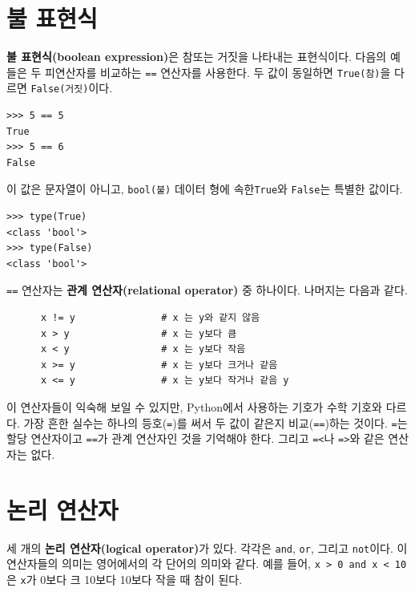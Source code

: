 \documentclass[10pt]{book}
\begin{document}
\section{불 표현식}

{\bf 불 표현식(boolean expression)}은 참또는 거짓을 나타내는 표현식이다.  다음의 예들은 두 피연산자를 비교하는 {\tt ==} 연산자를 사용한다.  두 값이 동일하면 {\tt True(참)}을 다르면 {\tt False(거짓)}이다. 

\begin{verbatim}
>>> 5 == 5
True
>>> 5 == 6
False
\end{verbatim}
%
이 값은 문자열이 아니고, {\tt bool(불)} 데이터 형에 속한{\tt True}와
{\tt False}는 특별한 값이다.

\begin{verbatim}
>>> type(True)
<class 'bool'>
>>> type(False)
<class 'bool'>
\end{verbatim}
%
{\tt ==} 연산자는 {\bf 관계 연산자(relational operator)} 중 하나이다.
나머지는 다음과 같다.

\begin{verbatim}
      x != y               # x 는 y와 같지 않음
      x > y                # x 는 y보다 큼
      x < y                # x 는 y보다 작음
      x >= y               # x 는 y보다 크거나 같음
      x <= y               # x 는 y보다 작거나 같음 y
\end{verbatim}
%
이 연산자들이 익숙해 보일 수 있지만, Python에서 사용하는 기호가 수학
기호와 다르다.  가장 흔한 실수는 하나의 등호({\tt =})를 써서 두 값이
같은지 비교({\tt ==})하는 것이다.  {\tt =}는 할당 연산자이고 {\tt ==}가
관계 연산자인 것을 기억해야 한다.  그리고 {\tt =<}나 {\tt =>}와 같은
연산자는 없다.



\section {논리 연산자}
  세 개의 {\bf 논리
  연산자(logical operator)}가 있다. 각각은 {\tt and}, {\tt or}, 그리고
{\tt not}이다.  이 연산자들의 의미는 영어에서의 각 단어의 의미와 같다.
예를 들어, {\tt x > 0 and x < 10} 은 {\tt x}가 0보다 크{} 10보다
10보다 작을 때 참이 된다.
\end{document}
